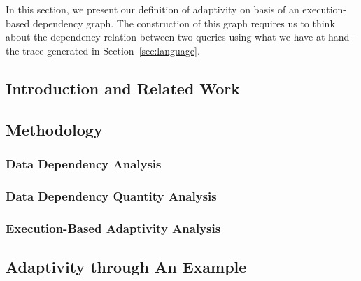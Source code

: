 
In this section, we present our definition of adaptivity on basis of an execution-based dependency graph. 
The construction of this graph requires us to think about the dependency relation between two queries using what we have at hand - 
the trace generated in Section~\ref{sec:language}. 

\subsection{Introduction and Related Work}
\label{subsec:dynamic-intro}


\subsection{Methodology}
\label{subsec:dynamic-methodology}

\subsubsection{Data Dependency Analysis}
\label{subsubsec:dynamic-datadep}

\subsubsection{Data Dependency Quantity Analysis}
\label{subsubsec:dynamic-reachability}
%
\subsubsection{Execution-Based Adaptivity Analysis}
\label{subsubsec:dynamic-adapt}
%
%
\subsection{Adaptivity through An Example}
\label{subsec:dynamic-examples}

%

% 
%
%